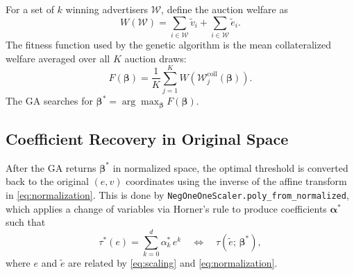 \documentclass[11pt]{article}
\begin{document}
For a set of $k$ winning advertisers $\mathcal{W}$, define the auction welfare as
\begin{equation}
    W(\mathcal{W}) = \sum_{i \in \mathcal{W}} \tilde{v}_i + \sum_{i \in \mathcal{W}} \tilde{e}_i.
\end{equation}
The fitness function used by the genetic algorithm is the mean collateralized welfare
averaged over all $K$ auction draws:
\begin{equation}
    F(\boldsymbol{\beta})
    = \frac{1}{K} \sum_{j=1}^{K} W\!\left(\mathcal{W}_j^{\text{coll}}(\boldsymbol{\beta})\right).
\end{equation}
The GA searches for $\boldsymbol{\beta}^* = \arg\max_{\boldsymbol{\beta}} F(\boldsymbol{\beta})$.

\subsection{Coefficient Recovery in Original Space}

After the GA returns $\boldsymbol{\beta}^*$ in normalized space, the optimal threshold is
converted back to the original $(e, v)$ coordinates using the inverse of the affine
transform in \eqref{eq:normalization}. This is done by
\texttt{NegOneOneScaler.poly\_from\_normalized}, which applies a change of variables
via Horner's rule to produce coefficients $\boldsymbol{\alpha}^*$ such that
\begin{equation}
    \tau^*(e) = \sum_{k=0}^{d} \alpha_k^*\, e^k
    \quad\Longleftrightarrow\quad
    \tau(\tilde{e};\,\boldsymbol{\beta}^*),
\end{equation}
where $e$ and $\tilde{e}$ are related by \eqref{eq:scaling} and \eqref{eq:normalization}.
\end{document}

